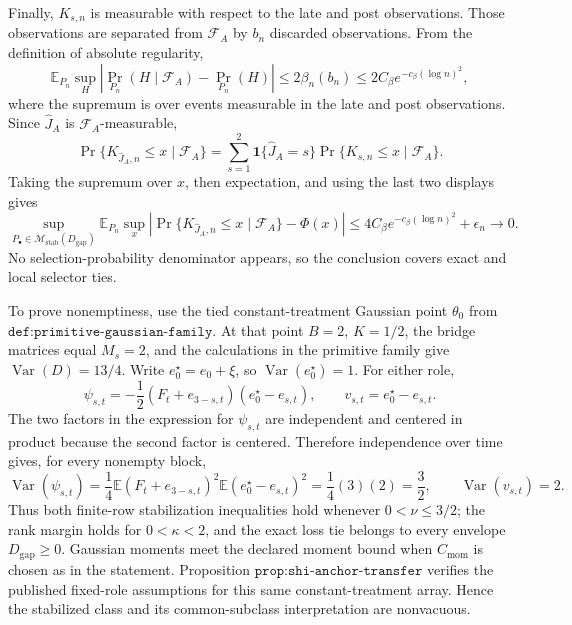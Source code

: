 Finally, \(K_{s,n}\) is measurable with respect to the late and post observations.  Those observations are separated from \(\mathcal F_A\) by \(b_n\) discarded observations.  From the definition of absolute regularity,
\[
 \mathbb E_{P_n}\sup_{H}
 |\Pr_{P_n}(H\mid\mathcal F_A)-\Pr_{P_n}(H)|
 \leq2\beta_n(b_n)
 \leq2C_\beta e^{-c_\beta(\log n)^2},
\]
where the supremum is over events measurable in the late and post observations.  Since \(\widehat J_A\) is \(\mathcal F_A\)-measurable,
\[
 \Pr\{K_{\widehat J_A,n}\leq x\mid\mathcal F_A\}
 =\sum_{s=1}^2\mathbf 1\{\widehat J_A=s\}
   \Pr\{K_{s,n}\leq x\mid\mathcal F_A\}.
\]
Taking the supremum over \(x\), then expectation, and using the last two displays gives
\[
 \sup_{P_\bullet\in\mathcal M_{\mathrm{stab}}(D_{\mathrm{gap}})}
 \mathbb E_{P_n}\sup_x
 |\Pr\{K_{\widehat J_A,n}\leq x\mid\mathcal F_A\}-\Phi(x)|
 \leq4C_\beta e^{-c_\beta(\log n)^2}+\epsilon_n\longrightarrow0.
\]
No selection-probability denominator appears, so the conclusion covers exact and local selector ties.

To prove nonemptiness, use the tied constant-treatment Gaussian point \(\theta_0\) from \(\texttt{def:primitive-gaussian-family}\).  At that point \(B=2\), \(K=1/2\), the bridge matrices equal \(M_s=2\), and the calculations in the primitive family give \(\operatorname{Var}(D)=13/4\).  Write \(e_0^\star=e_0+\xi\), so \(\operatorname{Var}(e_0^\star)=1\).  For either role,
\[
 \psi_{s,t}=-\frac12(F_t+e_{3-s,t})(e_0^\star-e_{s,t}),
 \qquad
 v_{s,t}=e_0^\star-e_{s,t}.
\]
The two factors in the expression for \(\psi_{s,t}\) are independent and centered in product because the second factor is centered.  Therefore independence over time gives, for every nonempty block,
\[
 \operatorname{Var}(\psi_{s,t})
 =\frac14\mathbb E(F_t+e_{3-s,t})^2
       \mathbb E(e_0^\star-e_{s,t})^2
 =\frac14(3)(2)=\frac32,
 \qquad
 \operatorname{Var}(v_{s,t})=2.
\]
Thus both finite-row stabilization inequalities hold whenever \(0<\nu\leq3/2\); the rank margin holds for \(0<\kappa<2\), and the exact loss tie belongs to every envelope \(D_{\mathrm{gap}}\geq0\).  Gaussian moments meet the declared moment bound when \(C_{\mathrm{mom}}\) is chosen as in the statement.  Proposition \(\texttt{prop:shi-anchor-transfer}\) verifies the published fixed-role assumptions for this same constant-treatment array.  Hence the stabilized class and its common-subclass interpretation are nonvacuous.
